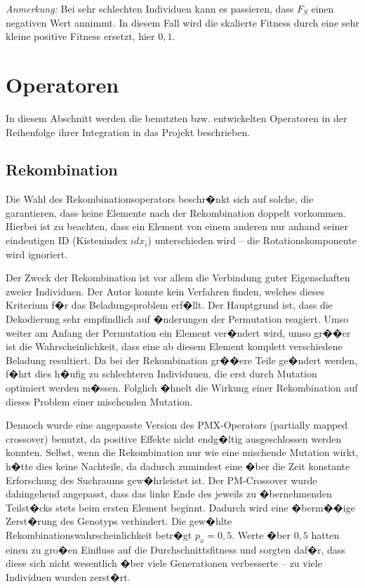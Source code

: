 \documentclass[a4paper,abstracton,12pt]{scrartcl}
\begin{document}
\emph{Anmerkung:} Bei sehr schlechten Individuen kann es passieren, dass $F_S$ einen negativen Wert annimmt. In diesem Fall wird die skalierte Fitness durch eine sehr kleine positive Fitness ersetzt, hier $0,1$.

\section{Operatoren}

In diesem Abschnitt werden die benutzten bzw. entwickelten Operatoren in der Reihenfolge ihrer Integration in das Projekt beschrieben.

\subsection{Rekombination}

Die Wahl des Rekombinationsoperators beschr�nkt sich auf solche, die garantieren, dass keine Elemente nach der Rekombination doppelt vorkommen. Hierbei ist zu beachten, dass ein Element von einem anderen nur anhand seiner eindeutigen ID (Kistenindex $idx_i$) unterschieden wird -- die Rotationskomponente wird ignoriert.

Der Zweck der Rekombination ist vor allem die Verbindung guter Eigenschaften zweier Individuen. Der Autor konnte kein Verfahren finden, welches dieses Kriterium f�r das Beladungsproblem erf�llt. Der Hauptgrund ist, dass die Dekodierung sehr empfindlich auf �nderungen der Permutation reagiert. Umso weiter am Anfang der Permutation ein Element ver�ndert wird, umso gr��er ist die Wahrscheinlichkeit, dass eine ab diesem Element komplett verschiedene Beladung resultiert. Da bei der Rekombination gr��ere Teile ge�ndert werden, f�hrt dies h�ufig zu schlechteren Individuuen, die erst durch Mutation optimiert werden m�ssen. Folglich �hnelt die Wirkung einer Rekombination auf dieses Problem einer mischenden Mutation.

Dennoch wurde eine angepasste Version des PMX-Operators \cite{pmx} (partially mapped crossover) benutzt, da positive Effekte nicht endg�ltig ausgeschlossen werden konnten. Selbst, wenn die Rekombination nur wie eine mischende Mutation wirkt, h�tte dies keine Nachteile, da dadurch zumindest eine �ber die Zeit konstante Erforschung des Suchraums gew�hrleistet ist. Der PM-Crossover wurde dahingehend angepasst, dass das linke Ende des jeweils zu �bernehmenden Teilst�cks stets beim ersten Element beginnt. Dadurch wird eine �berm��ige Zerst�rung des Genotyps verhindert. Die gew�hlte Rekombinationswahrscheinlichkeit betr�gt $p_x = 0,5$. Werte �ber $0,5$ hatten einen zu gro�en Einfluss auf die Durchschnittsfitness und sorgten daf�r, dass diese sich nicht wesentlich �ber viele Generationen verbesserte -- zu viele Individuen wurden zerst�rt.
\end{document}
